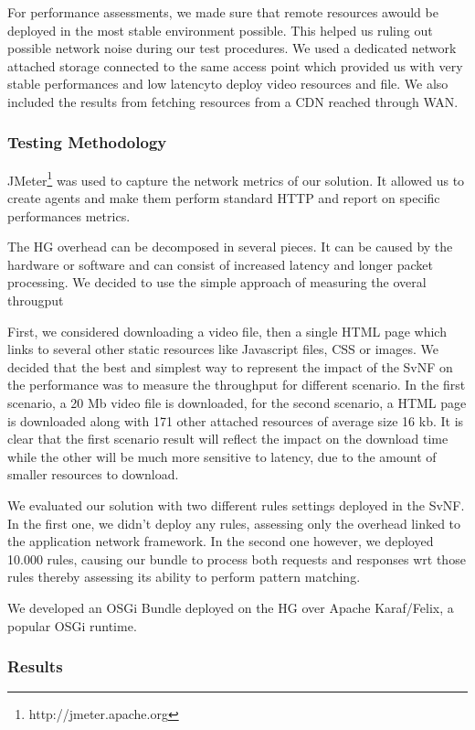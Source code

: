 For performance assessments, we made sure that remote resources awould be deployed in the most stable environment possible. This helped us ruling out possible network noise during our test procedures. We used a dedicated network attached storage connected to the same access point which provided us with very stable performances and low latencyto deploy video resources and file. We also included the results from fetching resources from a CDN reached through WAN.

 \subsubsection{Testing Methodology}
JMeter\footnote{http://jmeter.apache.org} was used to capture the network metrics of our solution.
It allowed us to create agents and make them perform standard HTTP and report on specific performances metrics.    

The HG overhead can be decomposed in several pieces.
It can be caused by the hardware or software and can consist of increased latency and longer packet processing.
We decided to use the simple approach of measuring the overal througput 

First, we considered downloading a video file, then a single HTML page which links to several other static resources like Javascript files, CSS or images. 
We decided that the best and simplest way to represent the impact of the SvNF on the performance was to measure the throughput for different scenario. In the first scenario, a 20 Mb video file is downloaded, for the second scenario, a HTML page is downloaded along with 171 other attached resources of average size 16 kb. It is clear that the first scenario result will reflect the impact on the download time while the other will be much more sensitive to latency, due to the amount of smaller resources to download.

We evaluated our solution with two different rules settings deployed in the SvNF. In the first one, we didn't deploy any rules, assessing only the overhead linked to the application network framework. In the second one however, we deployed 10.000 rules, causing our bundle to process both requests and responses wrt those rules thereby assessing its ability to perform pattern matching.

We developed an OSGi Bundle deployed on the HG over Apache Karaf/Felix, a popular OSGi runtime.

\subsubsection{Results}

